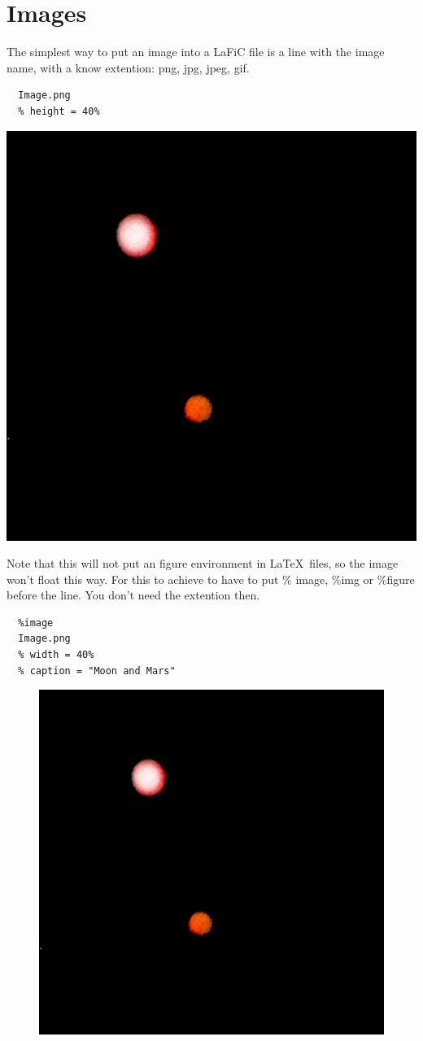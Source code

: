 \documentclass{article}
\begin{document}
\section{Images}
\label{}

{The simplest way to put an image into a LaFiC file is a
line with the image name, with a know extention: png, jpg,
jpeg, gif.\\}

\begin{verbatim}
  Image.png
  % height = 40%
\end{verbatim}


{\includegraphics[height=.40\textheight]{Image.png}}

{Note that this will not put an figure environment in \LaTeX\ 
files, so the image won't float this way. For this to
achieve to have to put \% image, \%img or \%figure before the
line. You don't need the extention then.\\}

\begin{verbatim}
  %image
  Image.png
  % width = 40%
  % caption = "Moon and Mars"
\end{verbatim}


\begin{figure}[hbt]
\includegraphics[width=.40\linewidth]{Image.png}
\end{figure}
\end{document}
